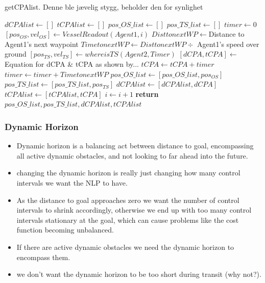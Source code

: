 \begin{algorithm}[t]
    \caption{getCPAlist. Denne ble jævelig stygg, beholder den for synlighet}\label{alg:getCPAlist}
    \begin{algorithmic}[1]
    \State $dCPAlist \gets []$
    \State $tCPAlist \gets []$
    \State $pos\_OS\_list \gets []$
    \State $pos\_TS\_list \gets []$
    \State $timer \gets 0$ 
        \State $[pos_{OS}, vel_{OS}] \gets VesselReadout(Agent1, i)$ 
        \State $DisttonextWP \gets $Distance to Agent1's next waypoint
        \State $TimetonextWP \gets DisttonextWP \div$ Agent1's speed over ground
        \State $[pos_{TS}, vel_{TS}] \gets whereisTS(Agent2, Timer)$ 
        \State $[dCPA, tCPA] \gets$ Equation for dCPA \& tCPA as shown by...
        \State $tCPA \gets tCPA + timer$ 
        \State $timer \gets timer + TimetonextWP$
        \State $pos\_OS\_list \gets [pos\_OS\_list, pos_{OS}]$ 
        \State $pos\_TS\_list \gets [pos\_TS\_list, pos_{TS}]$
        \State $dCPAlist \gets [dCPAlist, dCPA]$ 
        \State $tCPAlist \gets [tCPAlist, tCPA]$ 
        \State $i \gets i + 1$
    \EndFor
    \State \textbf{return} $pos\_OS\_list, pos\_TS\_list, dCPAlist, tCPAlist$
    \end{algorithmic}
\end{algorithm}

\subsubsection{Dynamic Horizon}
\begin{itemize}
    \item Dynamic horizon is a balancing act between distance to goal, encompassing all active dynamic obstacles, and not looking to far ahead into the future.
    \item changing the dynamic horizon is really just changing how many control intervals we want the NLP to have.
    \item As the distance to goal approaches zero we want the number of control intervals to shrink accordingly, otherwise we end up with too many control intervals stationary at the goal, which can cause problems like the cost function becoming unbalanced.
    \item If there are active dynamic obstacles we need the dynamic horizon to encompass them.
    \item we don't want the dynamic horizon to be too short during transit (why not?).
\end{itemize}

